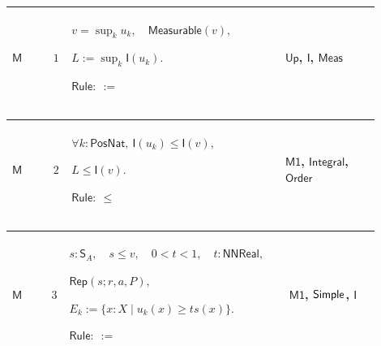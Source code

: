 \documentclass[12pt,reqno]{amsart}
\theoremstyle{blueplain}
\numberwithin{equation}{section}
\begin{document}
{\scriptsize \setlength{\parskip}{0pt}\nointerlineskip
\noindent 
\begin{tabular}{|@{}>{\centering\arraybackslash}m{0.10658\linewidth}|>{\centering\arraybackslash}m{0.03553\linewidth}|>{\centering\arraybackslash}m{0.52105\linewidth}|>{\centering\arraybackslash}m{0.23684\linewidth}|}
\hline
\hypertarget{proof:M1}{$\displaystyle \mathsf{M}$} & $\displaystyle 1$ & $%
\displaystyle v=\sup_k u_k,\quad\mathsf{Measurable}(v),$\par$\displaystyle %
L:=\sup_k\mathsf{I}(u_k).$\par$\displaystyle \mathsf{Rule}:\ :=$ & 
\hyperlink{def:Up}{$\displaystyle \mathsf{Up}$}, \hyperlink{def:I}{$%
\displaystyle \mathsf{I}$}, \hyperlink{lem:Meas}{$\displaystyle \mathsf{Meas}
$} \\ \hline
\end{tabular}%
}

{\scriptsize \setlength{\parskip}{0pt}\nointerlineskip
\noindent 
\begin{tabular}{|@{}>{\centering\arraybackslash}m{0.10658\linewidth}|>{\centering\arraybackslash}m{0.03553\linewidth}|>{\centering\arraybackslash}m{0.52105\linewidth}|>{\centering\arraybackslash}m{0.23684\linewidth}|}
\hline
\hypertarget{proof:M2}{$\displaystyle \mathsf{M}$} & $\displaystyle 2$ & $%
\displaystyle \forall k:\mathsf{PosNat},\ \mathsf{I}(u_k)\le\mathsf{I}(v),$%
\par$\displaystyle L\le\mathsf{I}(v).$\par$\displaystyle \mathsf{Rule}:\ \le$
& \hyperlink{proof:M1}{$\displaystyle \mathsf{M1}$}, \hyperlink{lem:Integral}%
{$\displaystyle \mathsf{Integral}$}, \hyperlink{ax:Order}{$\displaystyle 
\mathsf{Order}$} \\ \hline
\end{tabular}%
}

{\scriptsize \setlength{\parskip}{0pt}\nointerlineskip
\noindent 
\begin{tabular}{|@{}>{\centering\arraybackslash}m{0.10658\linewidth}|>{\centering\arraybackslash}m{0.03553\linewidth}|>{\centering\arraybackslash}m{0.52105\linewidth}|>{\centering\arraybackslash}m{0.23684\linewidth}|}
\hline
\hypertarget{proof:M3}{$\displaystyle \mathsf{M}$} & $\displaystyle 3$ & $%
\displaystyle s:\mathsf{S}_A,\quad s\le v,\quad0<t<1,\quad t:\mathsf{NNReal},
$\par$\displaystyle \mathsf{Rep}(s;r,a,P),$\par$\displaystyle E_k:=\{x:X\mid
u_k(x)\ge ts(x)\}.$\par$\displaystyle \mathsf{Rule}:\ :=$ & \hyperlink{proof:M1}%
{$\displaystyle \mathsf{M1}$}, \hyperlink{def:Simple}{$\displaystyle \mathsf{%
Simple}$}, \hyperlink{def:I}{$\displaystyle \mathsf{I}$} \\ \hline
\end{tabular}%
}
\end{document}
